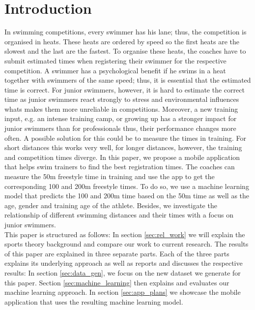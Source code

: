 \section{Introduction}


In swimming competitions, every swimmer has his lane; thus, the competition is organised in heats. These heats are ordered by speed so the first heats are the slowest and the last are the fastest. To organise these heats, the coaches have to submit estimated times when registering their swimmer for the respective competition. A swimmer has a psychological benefit if he swims in a heat together with swimmers of the same speed; thus, it is essential that the estimated time is correct. For junior swimmers, however, it is hard to estimate the correct time as junior swimmers react strongly to stress and environmental influences whats makes them more unreliable in competitions. Moreover, a new training input, e.g. an intense training camp, or growing up has a stronger impact for junior swimmers than for professionals thus, their performance changes more often. A possible solution for this could be to measure the times in training. For short distances this works very well, for longer distances, however, the training and competition times diverge. In this paper, we propose a mobile application that helps swim trainers to find the best registration times. The coaches can measure the 50m freestyle time in training and use the app to get the corresponding 100 and 200m freestyle times. To do so, we use a machine learning model that predicts the 100 and 200m time based on the 50m time as well as the age, gender and training age of the athlete. Besides, we investigate the relationship of different swimming distances and their times with a focus on junior swimmers.\\
This paper is structured as follows: In section \ref{sec:rel_work} we will explain the sports theory background and compare our work to current research. The results of this paper are explained in three separate parts. Each of the three parts explains its underlying approach as well as reports and discusses the respective results: In section \ref{sec:data_gen}, we focus on the new dataset we generate for this paper. Section \ref{sec:machine_learning} then explains and evaluates our machine learning approach. In section \ref{sec:app_plans} we  showcase the mobile application that uses the resulting machine learning model.